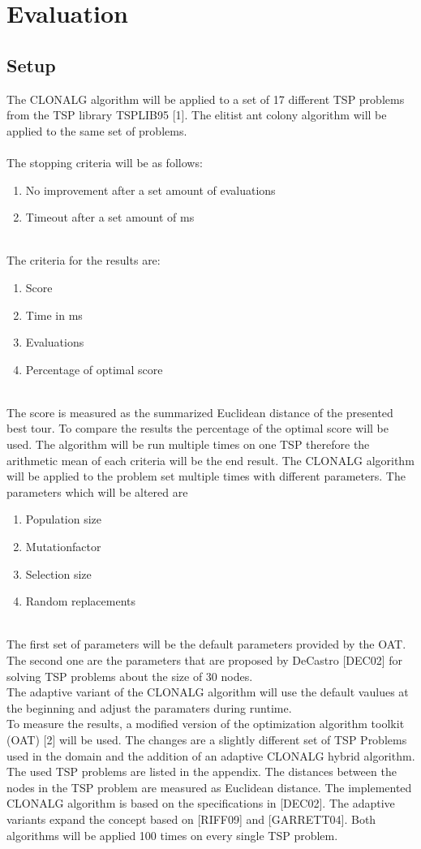 \chapter{Evaluation}
\label{chap:eva}
\section{Setup}
The CLONALG algorithm will be applied to a set of 17 different TSP problems from the TSP library TSPLIB95 [1]. The elitist ant colony algorithm will be applied to the same set of problems.\\\\ 
The stopping criteria will be as follows:
\begin{enumerate}
	\item 	No improvement after a set amount of evaluations
	\item 	Timeout after a set amount of ms
\end{enumerate}\\
The criteria for the results are:
\begin{enumerate}
	\item 	Score
	\item 	Time in ms
	\item 	Evaluations	
	\item  	Percentage of optimal score
\end{enumerate}\\
The score is measured as the summarized Euclidean distance of the presented best tour. To compare the results the percentage of the optimal score will be used. The algorithm will be run multiple times on one TSP therefore the arithmetic mean of each criteria will be the end result. The CLONALG algorithm will be applied to the problem set multiple times with different parameters.
The parameters which will be altered are
\begin{enumerate}
	\item 	Population size
	\item 	Mutationfactor
	\item 	Selection size
	\item 	Random replacements	
\end{enumerate}\\
The first set of parameters will be the default parameters provided by the OAT. The second one are the parameters that are proposed by DeCastro [DEC02] for solving TSP problems about the size of 30 nodes.\\
The adaptive variant of the CLONALG algorithm will use the default vaulues at the beginning and adjust the paramaters during runtime.\\
To measure the results, a modified version of the optimization algorithm toolkit (OAT) [2] will be used. The changes are a slightly different set of TSP Problems used in the domain and the addition of an adaptive CLONALG hybrid algorithm. The used TSP problems are listed in the appendix. The distances between the nodes in the TSP problem are measured as Euclidean distance. The implemented CLONALG algorithm is based on the specifications in [DEC02]. The adaptive variants expand the concept based on [RIFF09] and [GARRETT04].
Both algorithms will be applied 100 times on every single TSP problem. 
